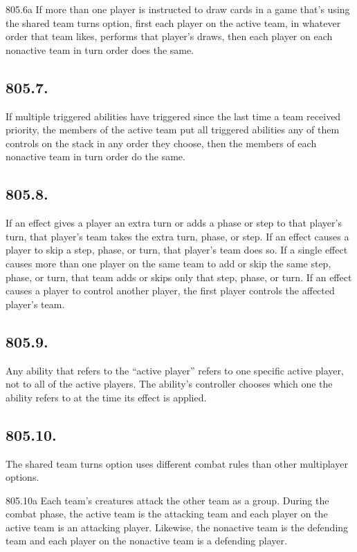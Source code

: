805.6a If more than one player is instructed to draw cards in a game that’s using the shared team turns option, first each player on the active team, in whatever order that team likes, performs that player’s draws, then each player on each nonactive team in turn order does the same.

\subsection*{805.7.}
If multiple triggered abilities have triggered since the last time a team received priority, the members of the active team put all triggered abilities any of them controls on the stack in any order they choose, then the members of each nonactive team in turn order do the same.

\subsection*{805.8.}
If an effect gives a player an extra turn or adds a phase or step to that player’s turn, that player’s team takes the extra turn, phase, or step. If an effect causes a player to skip a step, phase, or turn, that player’s team does so. If a single effect causes more than one player on the same team to add or skip the same step, phase, or turn, that team adds or skips only that step, phase, or turn. If an effect causes a player to control another player, the first player controls the affected player’s team.

\subsection*{805.9.}
Any ability that refers to the “active player” refers to one specific active player, not to all of the active players. The ability’s controller chooses which one the ability refers to at the time its effect is applied.

\subsection*{805.10.}
The shared team turns option uses different combat rules than other multiplayer options.

805.10a Each team’s creatures attack the other team as a group. During the combat phase, the active team is the attacking team and each player on the active team is an attacking player. Likewise, the nonactive team is the defending team and each player on the nonactive team is a defending player.

